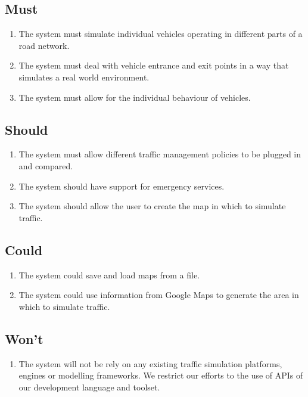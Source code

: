 \documentclass[11pt,a4paper]{article}
\begin{document}
\subsection{Must}
\begin{enumerate}
  \item The system must simulate individual vehicles operating in different parts of a road network.
  \item The system must deal with vehicle entrance and exit points in a way that simulates a real world environment.
  \item The system must allow for the individual behaviour of vehicles.
\end{enumerate}

\subsection{Should}
\begin{enumerate}
  \item The system must allow different traffic management policies to be plugged in and compared.
  \item The system should have support for emergency services.
  \item The system should allow the user to create the map in which to simulate traffic.
\end{enumerate}

\subsection{Could}
\begin{enumerate}
  \item The system could save and load maps from a file.
  \item The system could use information from Google Maps to generate the area in which to simulate traffic.
\end{enumerate}

\subsection{Won't}
\begin{enumerate}
  \item The system will not be rely on any existing traffic simulation platforms, engines or modelling frameworks.  We restrict our efforts to the use of APIs of our development language and toolset.
\end{enumerate}
\end{document}
